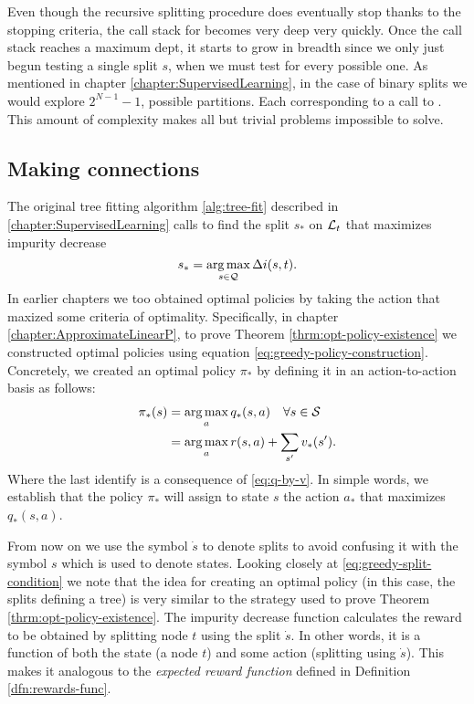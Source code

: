 Even though the recursive splitting procedure does eventually stop thanks to the
stopping criteria, the call stack for \TrueBestSplit becomes very deep very
quickly. Once the call stack reaches a maximum dept, it starts to grow in
breadth since we only just begun testing a single split $s$, when we must test
for every possible one. As mentioned in chapter
\ref{chapter:SupervisedLearning}, in the case of binary splits we would explore
$2^{N -1}-1$, possible partitions. Each corresponding to a call to
\TrueBestSplit. This amount of complexity makes all but trivial problems
impossible to solve. 

\subsection{Making connections}

The original tree fitting algorithm \ref{alg:tree-fit} described in
\ref{chapter:SupervisedLearning} calls to find the split $s_*$ on $\mathcal{L}_t$ that
maximizes impurity decrease
\begin{equation}
    \label{eq:greedy-split-condition}
    s_* = \operatorname*{arg\,max}_{s \in \mathcal{Q}} \Delta i(s, t).
\end{equation}
In earlier chapters we too obtained optimal policies by taking the action that
maxized some criteria of optimality. Specifically, in chapter
\ref{chapter:ApproximateLinearP}, to prove Theorem
\ref{thrm:opt-policy-existence} we constructed optimal policies using equation
\eqref{eq:greedy-policy-construction}. Concretely, we created an optimal policy
$\pi_*$ by defining it in an action-to-action basis as follows:
\begin{align*}
    \pi_{*} (s) &= \operatorname*{arg\,max}_{a} q_{*} (s, a) \quad \forall s \in \mathcal{S} \\
    &= \operatorname*{arg\,max}_a r(s, a) + \sum_{s'} v_* (s').
\end{align*}
Where the last identify is a consequence of \eqref{eq:q-by-v}. In simple words,
we establish that the policy $\pi_*$ will assign to state $s$ the action $a_*$
that maximizes $q_* (s, a)$. 

From now on we use the symbol $\dot{s}$ to denote splits to avoid confusing it
with the symbol $s$ which is used to denote states. Looking closely at
\eqref{eq:greedy-split-condition} we note that the idea for creating an optimal
policy (in this case, the splits defining a tree) is very similar to the
strategy used to prove Theorem \ref{thrm:opt-policy-existence}. The impurity
decrease function calculates the reward to be obtained by splitting node $t$
using the split $\dot{s}$. In other words, it is a function of both the state (a
node $t$) and some action (splitting using $\dot{s}$). This makes it analogous
to the \emph{expected reward function} defined in Definition
\ref{dfn:rewards-func}.

